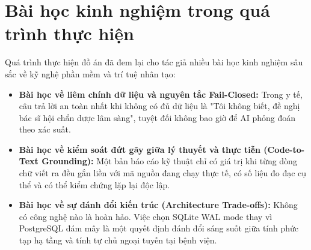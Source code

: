 \section{Bài học kinh nghiệm trong quá trình thực hiện}
\label{sec:lessons_learned}

Quá trình thực hiện đồ án đã đem lại cho tác giả nhiều bài học kinh nghiệm sâu sắc về kỹ nghệ phần mềm và trí tuệ nhân tạo:
\begin{itemize}[leftmargin=1.5em]
    \item \textbf{Bài học về liêm chính dữ liệu và nguyên tắc Fail-Closed:} Trong y tế, câu trả lời an toàn nhất khi không có đủ dữ liệu là "Tôi không biết, đề nghị bác sĩ hội chẩn dược lâm sàng", tuyệt đối không bao giờ để AI phỏng đoán theo xác suất.
    \item \textbf{Bài học về kiểm soát đứt gãy giữa lý thuyết và thực tiễn (Code-to-Text Grounding):} Một bản báo cáo kỹ thuật chỉ có giá trị khi từng dòng chữ viết ra đều gắn liền với mã nguồn đang chạy thực tế, có số liệu đo đạc cụ thể và có thể kiểm chứng lặp lại độc lập.
    \item \textbf{Bài học về sự đánh đổi kiến trúc (Architecture Trade-offs):} Không có công nghệ nào là hoàn hảo. Việc chọn SQLite WAL mode thay vì PostgreSQL đám mây là một quyết định đánh đổi sáng suốt giữa tính phức tạp hạ tầng và tính tự chủ ngoại tuyến tại bệnh viện.
\end{itemize}
